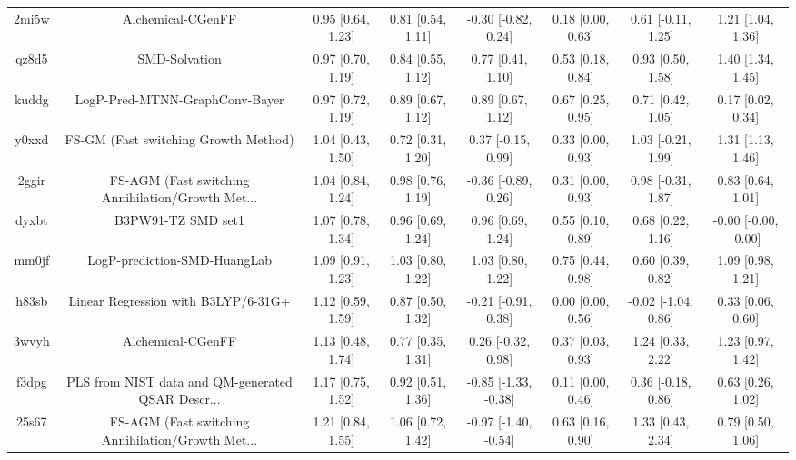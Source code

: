 \documentclass{article}
\begin{document}
\begin{center}
\begin{longtable}{|cccccccc|}
 2mi5w &                                  Alchemical-CGenFF &  0.95 [0.64, 1.23] &  0.81 [0.54, 1.11] &   -0.30 [-0.82, 0.24] &  0.18 [0.00, 0.63] &   0.61 [-0.11, 1.25] &     1.21 [1.04, 1.36] \\
 qz8d5 &                                      SMD-Solvation &  0.97 [0.70, 1.19] &  0.84 [0.55, 1.12] &     0.77 [0.41, 1.10] &  0.53 [0.18, 0.84] &    0.93 [0.50, 1.58] &     1.40 [1.34, 1.45] \\
 kuddg &                     LogP-Pred-MTNN-GraphConv-Bayer &  0.97 [0.72, 1.19] &  0.89 [0.67, 1.12] &     0.89 [0.67, 1.12] &  0.67 [0.25, 0.95] &    0.71 [0.42, 1.05] &     0.17 [0.02, 0.34] \\
 y0xxd &               FS-GM (Fast switching Growth Method) &  1.04 [0.43, 1.50] &  0.72 [0.31, 1.20] &    0.37 [-0.15, 0.99] &  0.33 [0.00, 0.93] &   1.03 [-0.21, 1.99] &     1.31 [1.13, 1.46] \\
 2ggir &  FS-AGM (Fast switching Annihilation/Growth Met... &  1.04 [0.84, 1.24] &  0.98 [0.76, 1.19] &   -0.36 [-0.89, 0.26] &  0.31 [0.00, 0.93] &   0.98 [-0.31, 1.87] &     0.83 [0.64, 1.01] \\
 dyxbt &                                 B3PW91-TZ SMD set1 &  1.07 [0.78, 1.34] &  0.96 [0.69, 1.24] &     0.96 [0.69, 1.24] &  0.55 [0.10, 0.89] &    0.68 [0.22, 1.16] &  -0.00 [-0.00, -0.00] \\
 mm0jf &                       LogP-prediction-SMD-HuangLab &  1.09 [0.91, 1.23] &  1.03 [0.80, 1.22] &     1.03 [0.80, 1.22] &  0.75 [0.44, 0.98] &    0.60 [0.39, 0.82] &     1.09 [0.98, 1.21] \\
 h83sb &                Linear Regression with B3LYP/6-31G+ &  1.12 [0.59, 1.59] &  0.87 [0.50, 1.32] &   -0.21 [-0.91, 0.38] &  0.00 [0.00, 0.56] &  -0.02 [-1.04, 0.86] &     0.33 [0.06, 0.60] \\
 3wvyh &                                  Alchemical-CGenFF &  1.13 [0.48, 1.74] &  0.77 [0.35, 1.31] &    0.26 [-0.32, 0.98] &  0.37 [0.03, 0.93] &    1.24 [0.33, 2.22] &     1.23 [0.97, 1.42] \\
 f3dpg &  PLS from NIST data and QM-generated QSAR Descr... &  1.17 [0.75, 1.52] &  0.92 [0.51, 1.36] &  -0.85 [-1.33, -0.38] &  0.11 [0.00, 0.46] &   0.36 [-0.18, 0.86] &     0.63 [0.26, 1.02] \\
 25s67 &  FS-AGM (Fast switching Annihilation/Growth Met... &  1.21 [0.84, 1.55] &  1.06 [0.72, 1.42] &  -0.97 [-1.40, -0.54] &  0.63 [0.16, 0.90] &    1.33 [0.43, 2.34] &     0.79 [0.50, 1.06] \\

\end{longtable}
\end{center}
\end{document}
